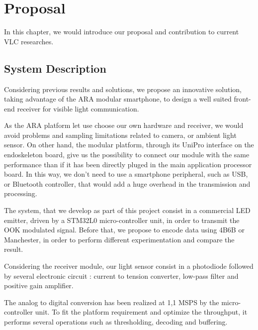 
\chapter{Proposal} %

\label{Proposal} %


In this chapter, we would introduce our proposal and contribution to current VLC researches. 


\section{System Description}


Considering previous results and solutions, we propose an innovative solution, taking advantage of the ARA modular smartphone,
to design a well suited front-end receiver for visible light communication.

As the ARA platform let use choose our own hardware and receiver, we would avoid problems and sampling limitations related to camera, or ambient light sensor.
On other hand, the modular platform, through its UniPro interface on the endoskeleton board, give us the possibility to connect our module with the same performance than if it has been directly pluged in the main application processor board.
In this way, we don't need to use a smartphone peripheral, such as USB, or Bluetooth controller, that would add a huge overhead in the transmission and processing.

The system, that we develop as part of this project consist in a commercial LED emitter, driven by a STM32L0 micro-controller unit, in order to transmit the OOK modulated signal. Before that, we propose to encode data using 4B6B or Manchester, in order to perform different experimentation and compare the result.

Considering the receiver module, our light sensor consist in a photodiode followed by several electronic circuit : current to tension converter, low-pass filter and positive gain amplifier.

The analog to digital conversion has been realized at 1,1 MSPS by the micro-controller unit. To fit the platform requirement and optimize the throughput, it performs several operations such as thresholding, decoding and buffering.

